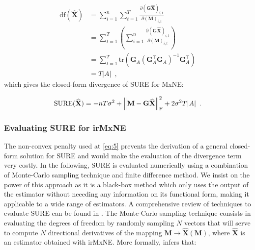 \begin{align*}
    \text{df}(\widehat{\mathbf{X}})
    &= \sum_{i=1}^n \sum_{t=1}^T
    \frac{
        \partial (\mathbf{G}\widehat{\mathbf{X}})_{i, t}
    }{
        \partial (\mathbf{M})_{i, t}
    } \\
    &= \sum_{t=1}^T \left(
        \sum_{i=1}^n \frac{
            \partial (\mathbf{G}\widehat{\mathbf{X}})_{i, t}
            }{
                \partial (\mathbf{M})_{i, t}
            }
    \right) \\
    &= \sum_{t=1}^T \text{tr}(
        \mathbf{G}_A (\mathbf{G}_A^{\top}\mathbf{G}_A)^{-1}\mathbf{G}_A^{\top}
    ) \\
    &= T \lvert A \rvert
    \enspace ,
\end{align*}
%
which gives the closed-form divergence of SURE for MxNE:

\begin{equation} \label{eq:8}
    \text{SURE}(\widehat{\mathbf{X}})
    = -nT\sigma^2 + \left \lVert 
        \mathbf{M} - \mathbf{G}\widehat{\mathbf{X}}
     \right \rVert_{\text{F}}^2
    + 2 \sigma^2 T \lvert A \rvert
    \enspace .
\end{equation}

\subsubsection{Evaluating SURE for irMxNE}

The non-convex penalty used at \eqref{eq:5} prevents the derivation of a general closed-form solution for SURE and would make
the evaluation of the divergence term very costly. In the following,
SURE is evaluated numerically using a combination of Monte-Carlo sampling technique and finite difference method.
We insist on the power of this approach as it is a black-box method which only uses the output of the estimator without neeeding
any information on its functional form, making it applicable to a wide range of estimators.
A comprehensive review of techniques to evaluate SURE can be found in \cite{Deledalle_Vaiter_Fadili_Peyre14}.
The Monte-Carlo sampling technique consists in evaluating the degrees of freedom by randomly sampling $N$ vectors that will
serve to compute $N$ directional derivatives of the mapping $\mathbf{M} \rightarrow \widehat{\mathbf{X}}(\mathbf{M})$, where
$\widehat{\mathbf{X}}$ is an estimator obtained with irMxNE. More formally, \cite{Deledalle_Vaiter_Fadili_Peyre14} infers that:

